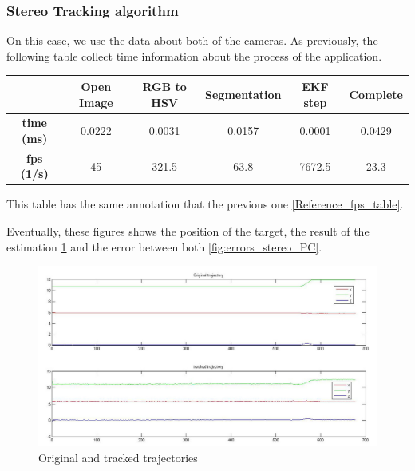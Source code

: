 	\newpage
	
		
	\subsubsection{Stereo Tracking algorithm}
	
	On this case, we use the data about both of the cameras. As previously, the following table collect time information about the process of the application. \\
		
	{                
	\centering
		\begin{tabular}{|c|c|c|c|c||c|}
		\hline  					&  Open Image	&  RGB to HSV 	& Segmentation 	& EKF step  & Complete \\ 
		\hline  \textbf{time (ms)}	&	0.0222		& 	0.0031 		&  	0.0157		&  	0.0001 	&  0.0429		\\ 
		\hline  \textbf{fps (1/s)}	& 	45 			& 	321.5 		& 	63.8 		& 7672.5	&  23.3		\\ 
		\hline 
		\end{tabular} 
	}
	\newline
	
	This table has the same annotation that the previous one \ref{Reference_fps_table}.
	
	Eventually, these figures shows the position of the target, the result of the estimation \ref{fig:trajectories_stereo_PC} and the error between both \ref{fig:errors_stereo_PC}.
	
	\begin{figure}[hp]
		\centering
		\includegraphics[width=\linewidth]{../Images/c4/trajs_stereo}
		\caption{Original and tracked trajectories}
		\label{fig:trajectories_stereo_PC}
	\end{figure}
	
